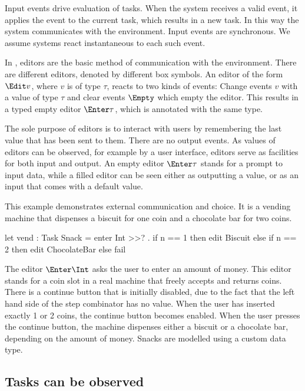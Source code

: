 Input events drive evaluation of tasks.
When the system receives a valid event, it applies the event to the current task, which results in a new task.
In this way the system communicates with the environment.
Input events are synchronous.
We assume systems react instantaneous to each such event.

In \TOPHAT, editors are the basic method of communication with the environment.
There are different editors, denoted by different box symbols.
An editor of the form $\Edit v$, where $v$ is of type $\tau$, reacts to two kinds of events:
Change events $v$ with a value of type $\tau$ and clear events $\Empty$ which empty the editor.
This results in a typed empty editor $\Enter \tau$, which is annotated with the same type.

The sole purpose of editors is to interact with users by remembering the last value that has been sent to them.
There are no output events.
As values of editors can be observed, for example by a user interface, editors serve as facilities for both input and output.
An empty editor $\Enter \tau$ stands for a prompt to input data, while a filled editor can be seen either as outputting a value, or as an input that comes with a default value.

\begin{example}
\label{Vending machine}

This example demonstrates external communication and choice.
It is a vending machine that dispenses a biscuit for one coin and a chocolate bar for two coins.
\begin{TASK}
  let vend : Task Snack = enter Int >>? \n. if n == 1 then edit Biscuit
    else if n == 2 then edit ChocolateBar
    else fail
\end{TASK}
The editor $\Enter \Int$ asks the user to enter an amount of money.
This editor stands for a coin slot in a real machine that freely accepts and returns coins.
There is a continue button that is initially disabled, due to the fact that the left hand side of the step combinator has no value.
When the user has inserted exactly 1 or 2 coins, the continue button becomes enabled.
When the user presses the continue button, the machine dispenses either a biscuit or a chocolate bar, depending on the amount of money.
Snacks are modelled using a custom data type.

\end{example}



\subsection{Tasks can be observed}

